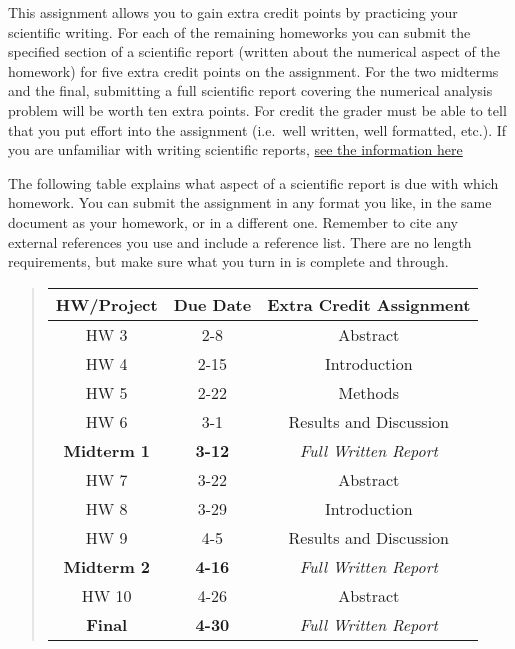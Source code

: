 \documentclass[%
oneside,                 %
final,                   %
10pt]{article}
\begin{document}
This assignment allows you to gain extra credit points by practicing
your scientific writing.  For each of the remaining homeworks you can
submit the specified section of a scientific report (written about the
numerical aspect of the homework) for five extra credit points on the
assignment.  For the two midterms and the final, submitting a full
scientific report covering the numerical analysis problem will be
worth ten extra points.  For credit the grader must be able to tell
that you put effort into the assignment (i.e.~well written, well
formatted, etc.).  If you are unfamiliar with writing scientific
reports, \href{{https://github.com/mhjensen/Physics321/blob/master/doc/Homeworks/ExtraCredits/IntroductionScientificWriting.md}}{see the information here}

The following table explains what aspect of a scientific report is due
with which homework.  You can submit the assignment in any format you
like, in the same document as your homework, or in a different one.
Remember to cite any external references you use and include a
reference list.  There are no length requirements, but make sure what
you turn in is complete and through.


\begin{quote}
\begin{tabular}{ccc}
\hline
\multicolumn{1}{c}{ HW/Project } & \multicolumn{1}{c}{ Due Date } & \multicolumn{1}{c}{ Extra Credit Assignment } \\
\hline
HW 3               & 2-8           & Abstract                   \\
HW 4               & 2-15          & Introduction               \\
HW 5               & 2-22          & Methods                    \\
HW 6               & 3-1           & Results and Discussion     \\
\textbf{Midterm 1} & \textbf{3-12} & \emph{Full Written Report} \\
HW 7               & 3-22          & Abstract                   \\
HW 8               & 3-29          & Introduction               \\
HW 9               & 4-5           & Results and Discussion     \\
\textbf{Midterm 2} & \textbf{4-16} & \emph{Full Written Report} \\
HW 10              & 4-26          & Abstract                   \\
\textbf{Final}     & \textbf{4-30} & \emph{Full Written Report} \\
\hline
\end{tabular}
\end{quote}
\end{document}
